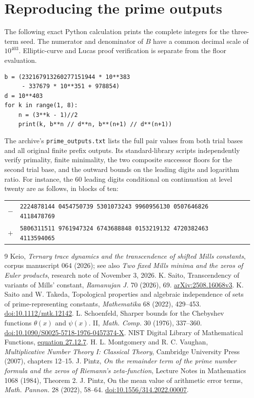 \documentclass[11pt]{article}
\begin{document}
\section{Reproducing the prime outputs}
The following exact Python calculation prints the complete integers for the three-term seed. The numerator and denominator of $B$ have a common decimal scale of $10^{403}$. Elliptic-curve and Lucas proof verification is separate from the floor evaluation.
\begin{verbatim}
b = (232167913260277151944 * 10**383
     - 337679 * 10**351 + 978854)
d = 10**403
for k in range(1, 8):
    n = (3**k - 1)//2
    print(k, b**n // d**n, b**(n+1) // d**(n+1))
\end{verbatim}
The archive's \texttt{prime\_outputs.txt} lists the full pair values from both trial bases and all original finite prefix outputs. Its standard-library scripts independently verify primality, finite minimality, the two composite successor floors for the second trial base, and the outward bounds on the leading digits and logarithm ratio. For instance, the 60 leading digits conditional on continuation at level twenty are as follows, in blocks of ten:
\begin{center}\small
\begin{tabular}{l@{\quad}l}
$-$ & \texttt{2224878144 0454750739 5301073243 9960956130 0507646826 4118478769}\\
$+$ & \texttt{5806311511 9761947324 6743688848 0153219132 4720382463 4113594065}
\end{tabular}
\end{center}
\begin{thebibliography}{9}
 Keio, \emph{Ternary trace dynamics and the transcendence of shifted Mills constants}, corpus manuscript 064 (2026); see also \emph{Two fixed Mills minima and the zeros of Euler products}, research note of November 3, 2026.
 K. Saito, Transcendency of variants of Mills' constant, \emph{Ramanujan J.} 70 (2026), 69. \href{https://arxiv.org/html/2508.16068v3}{arXiv:2508.16068v3}.
 K. Saito and W. Takeda, Topological properties and algebraic independence of sets of prime-representing constants, \emph{Mathematika} 68 (2022), 429--453. \href{https://doi.org/10.1112/mtk.12142}{doi:10.1112/mtk.12142}.
 L. Schoenfeld, Sharper bounds for the Chebyshev functions $\theta(x)$ and $\psi(x)$. II, \emph{Math. Comp.} 30 (1976), 337--360. \href{https://doi.org/10.1090/S0025-5718-1976-0457374-X}{doi:10.1090/S0025-5718-1976-0457374-X}.
 NIST Digital Library of Mathematical Functions, \href{https://dlmf.nist.gov/27.12.E7}{equation 27.12.7}.
 H. L. Montgomery and R. C. Vaughan, \emph{Multiplicative Number Theory I: Classical Theory}, Cambridge University Press (2007), chapters 12--15.
 J. Pintz, \emph{On the remainder term of the prime number formula and the zeros of Riemann's zeta-function}, Lecture Notes in Mathematics 1068 (1984), Theorem 2.
 J. Pintz, On the mean value of arithmetic error terms, \emph{Math. Pannon.} 28 (2022), 58--64. \href{https://doi.org/10.1556/314.2022.00007}{doi:10.1556/314.2022.00007}.
\end{thebibliography}
\end{document}
